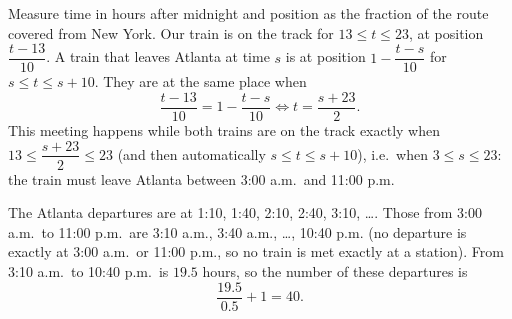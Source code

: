 Measure time in hours after midnight and position as the fraction of the route covered from New York. Our train is on the track for $13\le t\le23$, at position $\dfrac{t-13}{10}$. A train that leaves Atlanta at time $s$ is at position $1-\dfrac{t-s}{10}$ for $s\le t\le s+10$. They are at the same place when
\[
\dfrac{t-13}{10}=1-\dfrac{t-s}{10}\iff t=\dfrac{s+23}{2}.
\]
This meeting happens while both trains are on the track exactly when $13\le\dfrac{s+23}{2}\le23$ (and then automatically $s\le t\le s+10$), i.e.\ when $3\le s\le23$: the train must leave Atlanta between 3:00 a.m.\ and 11:00 p.m.

The Atlanta departures are at 1:10, 1:40, 2:10, 2:40, 3:10, \dots. Those from 3:00 a.m.\ to 11:00 p.m.\ are 3:10 a.m., 3:40 a.m., \dots, 10:40 p.m. (no departure is exactly at 3:00 a.m.\ or 11:00 p.m., so no train is met exactly at a station). From 3:10 a.m.\ to 10:40 p.m.\ is $19.5$ hours, so the number of these departures is
\[
\dfrac{19.5}{0.5}+1=\boxed{40}.
\]
